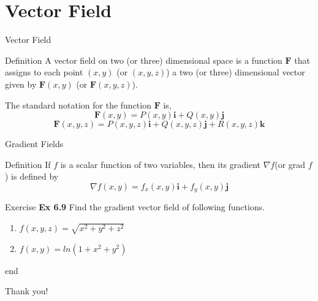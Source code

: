 \documentclass{beamer}
\begin{document}
\section{Vector Field}
    
\begin{frame}[label=3]{Vector Field}
    \begin{block}{Definition}
        A vector field on two (or three) dimensional space is a function $\boldsymbol{F}$ that assigns to each point $(x, y)$ (or $(x, y, z)$) a two (or three) dimensional vector given by $\boldsymbol{F}(x, y)$ (or $\boldsymbol{F}(x, y, z)$).
    \end{block}
    The standard notation for the function $\boldsymbol{F}$ is,
\[
\boldsymbol{F}(x, y) = P(x, y) \boldsymbol{i} + Q(x, y) \boldsymbol{j}
\]
\[
\boldsymbol{F}(x, y, z) = P(x, y, z) \boldsymbol{i} + Q(x, y, z) \boldsymbol{j} + R(x, y, z) \boldsymbol{k}
\]
\end{frame}
\begin{frame}{Gradient Fields}
\begin{block}{Definition}
    If $f$ is a scalar function of two variables, then its gradient $\nabla f$(or grad $f$) is defined by
    \begin{equation*}
        \nabla f(x,y)=f_x(x,y)\boldsymbol{i}+f_y(x,y)\boldsymbol{j}
    \end{equation*}
\end{block}
    
\end{frame}

\begin{frame}{Exercise}
    \textbf{Ex 6.9} Find the gradient vector field of following functions.
    \begin{enumerate}
        \item $f(x,y,z)=\sqrt{x^2+y^2+z^2}$
        \item $f(x,y)=ln(1+x^2+y^2)$
    \end{enumerate}
\end{frame}

\begin{frame}{\textcolor{green!30!black}{end}}
    \begin{center}
        \LARGE Thank you!
    \end{center}
\end{frame}
\end{document}
